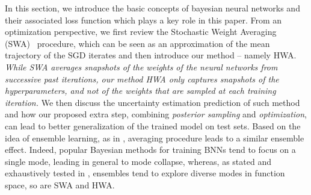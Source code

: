 \documentclass[tablecaption=bottom,wcp]{jmlr}
\begin{document}
In this section, we introduce the basic concepts of bayesian neural networks and their associated loss function which plays a key role in this paper.
From an optimization perspective, we first review the Stochastic Weight Averaging (SWA)~\citep{izmailov2018averaging} procedure, which can be seen as an approximation of the mean trajectory of the SGD iterates and then introduce our method -- namely \textsc{HWA}.
\textit{While SWA averages snapshots of the weights of the neural networks from successive past iterations, our method HWA only captures snapshots of the hyperparameters, and not of the weights that are sampled at each training iteration.}
We then discuss the uncertainty estimation prediction of such method and how our proposed extra step, combining \emph{posterior sampling} and \emph{optimization}, can lead to better generalization of the trained model on test sets.
Based on the idea of ensemble learning, as in \citep{garipov2018loss}, averaging procedure leads to a similar ensemble effect.
Indeed, popular Bayesian methods for training BNNs tend to focus on a single mode, leading in general to mode collapse, whereas, as stated and exhaustively tested in \citep{fort2019deep}, ensembles tend to explore diverse modes in function space, so are SWA and HWA.
\end{document}

